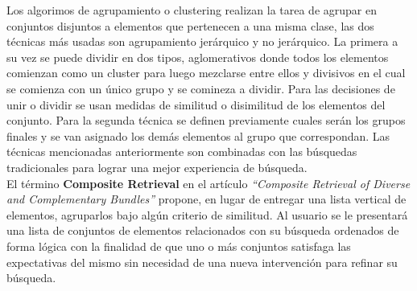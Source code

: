 Los algorimos de agrupamiento o clustering realizan la tarea de agrupar en conjuntos disjuntos a elementos que pertenecen a una misma clase, las dos técnicas más usadas son agrupamiento jerárquico y no jerárquico. La primera a su vez se puede dividir en dos tipos, aglomerativos donde todos los elementos comienzan como un cluster para luego mezclarse entre ellos y divisivos en el cual se comienza con un único grupo y se comineza a dividir. Para las decisiones de unir o dividir se usan medidas de similitud o disimilitud de los elementos del conjunto. Para la segunda técnica se definen previamente cuales serán los grupos finales y se van asignado los demás elementos al grupo que correspondan. Las técnicas mencionadas anteriormente son combinadas con las búsquedas tradicionales para lograr una mejor experiencia de búsqueda.\\
El término \textbf{Composite Retrieval} en el artículo \textit{\textquotedblleft Composite Retrieval of Diverse and Complementary Bundles\textquotedblright}\cite{compositeRetrival} propone, en lugar de entregar una lista vertical de elementos, agruparlos bajo algún criterio de similitud. Al usuario se le presentará una lista de conjuntos de elementos relacionados con su búsqueda ordenados de forma lógica con la finalidad de que uno o más conjuntos satisfaga las expectativas del mismo sin necesidad de una nueva intervención para refinar su búsqueda.

